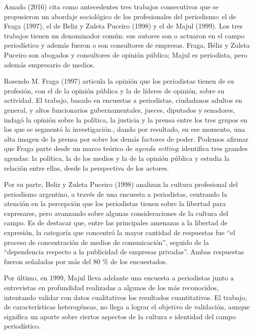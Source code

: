 {Amado (2016) cita como antecedentes tres trabajos consecutivos que se propusieron un abordaje sociológico de los profesionales del periodismo: el de Fraga (1997), el de Beliz y Zuleta Puceiro (1998) y el de Majul (1999). Los tres trabajos tienen un denominador común: sus autores son o actuaron en el campo periodístico y además fueron o son consultores de empresas. Fraga, Béliz y Zuleta Puceiro son abogados y consultores de opinión pública; Majul es periodista, pero además empresario de medios.

Rosendo M. Fraga (1997) articula la opinión que los periodistas tienen de su profesión, con el de la opinión pública y la de líderes de opinión, sobre su actividad. El trabajo, basado en encuestas a periodistas, ciudadanos adultos en general, y altos funcionarios gubernamentales, jueces, diputados y senadores, indagó la opinión sobre la política, la justicia y la prensa entre los tres grupos en los que se segmentó la investigación., dando por resultado, en ese momento, una alta imagen de la prensa por sobre los demás factores de poder. Podemos afirmar que Fraga parte desde un marco teórico de \emph{agenda setting}; identifica tres grandes agendas: la política, la de los medios y la de la opinión pública y estudia la relación entre ellas, desde la perspectiva de los actores.

Por su parte, Beliz y Zuleta Puceiro (1998) analizan la cultura profesional del periodismo argentino, a través de una encuesta a periodistas, centrando la atención en la percepción que los periodistas tienen sobre la libertad para expresarse, pero avanzando sobre algunas consideraciones de la cultura del campo. Es de destacar que, entre las principales amenazas a la libertad de expresión, la categoría que concentró la mayor cantidad de respuestas fue \enquote{el proceso de concentración de medios de comunicación}, seguido de la \enquote{dependencia respecto a la publicidad de empresas privadas}. Ambas respuestas fueron señaladas por más del 80 \% de los encuestados.

Por último, en 1999, Majul lleva adelante una encuesta a periodistas junto a entrevistas en profundidad realizadas a algunos de los más reconocidos, intentando validar con datos cualitativos los resultados cuantitativos. El trabajo, de características heterogéneas, no llega a lograr el objetivo de validación, aunque significa un aporte sobre ciertos aspectos de la cultura e identidad del campo periodístico.

}
